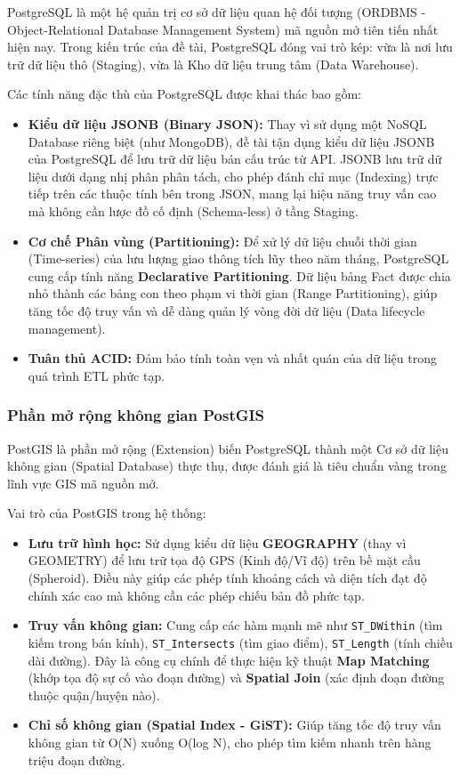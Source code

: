 PostgreSQL là một hệ quản trị cơ sở dữ liệu quan hệ đối tượng (ORDBMS - Object-Relational Database Management System) mã nguồn mở tiên tiến nhất hiện nay. Trong kiến trúc của đề tài, PostgreSQL đóng vai trò kép: vừa là nơi lưu trữ dữ liệu thô (Staging), vừa là Kho dữ liệu trung tâm (Data Warehouse).

Các tính năng đặc thù của PostgreSQL được khai thác bao gồm:
\begin{itemize}
    \item \textbf{Kiểu dữ liệu JSONB (Binary JSON):} Thay vì sử dụng một NoSQL Database riêng biệt (như MongoDB), đề tài tận dụng kiểu dữ liệu JSONB của PostgreSQL để lưu trữ dữ liệu bán cấu trúc từ API. JSONB lưu trữ dữ liệu dưới dạng nhị phân phân tách, cho phép đánh chỉ mục (Indexing) trực tiếp trên các thuộc tính bên trong JSON, mang lại hiệu năng truy vấn cao mà không cần lược đồ cố định (Schema-less) ở tầng Staging.
    \item \textbf{Cơ chế Phân vùng (Partitioning):} Để xử lý dữ liệu chuỗi thời gian (Time-series) của lưu lượng giao thông tích lũy theo năm tháng, PostgreSQL cung cấp tính năng \textbf{Declarative Partitioning}. Dữ liệu bảng Fact được chia nhỏ thành các bảng con theo phạm vi thời gian (Range Partitioning), giúp tăng tốc độ truy vấn và dễ dàng quản lý vòng đời dữ liệu (Data lifecycle management).
    \item \textbf{Tuân thủ ACID:} Đảm bảo tính toàn vẹn và nhất quán của dữ liệu trong quá trình ETL phức tạp.
\end{itemize}

\subsubsection{Phần mở rộng không gian PostGIS}

PostGIS là phần mở rộng (Extension) biến PostgreSQL thành một Cơ sở dữ liệu không gian (Spatial Database) thực thụ, được đánh giá là tiêu chuẩn vàng trong lĩnh vực GIS mã nguồn mở.

Vai trò của PostGIS trong hệ thống:
\begin{itemize}
    \item \textbf{Lưu trữ hình học:} Sử dụng kiểu dữ liệu \textbf{GEOGRAPHY} (thay vì GEOMETRY) để lưu trữ tọa độ GPS (Kinh độ/Vĩ độ) trên bề mặt cầu (Spheroid). Điều này giúp các phép tính khoảng cách và diện tích đạt độ chính xác cao mà không cần các phép chiếu bản đồ phức tạp.
    \item \textbf{Truy vấn không gian:} Cung cấp các hàm mạnh mẽ như \texttt{ST\_DWithin} (tìm kiếm trong bán kính), \texttt{ST\_Intersects} (tìm giao điểm), \texttt{ST\_Length} (tính chiều dài đường). Đây là công cụ chính để thực hiện kỹ thuật \textbf{Map Matching} (khớp tọa độ sự cố vào đoạn đường) và \textbf{Spatial Join} (xác định đoạn đường thuộc quận/huyện nào).
    \item \textbf{Chỉ số không gian (Spatial Index - GiST):} Giúp tăng tốc độ truy vấn không gian từ O(N) xuống O(log N), cho phép tìm kiếm nhanh trên hàng triệu đoạn đường.
\end{itemize}

